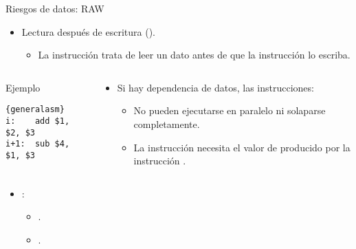 \begin{frame}[t,fragile]{Riesgos de datos: RAW}
\begin{itemize}
  \item Lectura después de escritura ().
    \begin{itemize}
      \item La instrucción  trata de leer un dato antes de que la
            instrucción  lo escriba.
    \end{itemize}
\end{itemize}
\begin{columns}
\begin{column}{.25\textwidth}
\begin{block}{Ejemplo}
\begin{lstlisting}{generalasm}
i:    add $1, $2, $3
i+1:  sub $4, $1, $3
\end{lstlisting}
\end{block}
\end{column}
\begin{column}{.75\textwidth}
\begin{itemize}
  \item Si hay dependencia de datos, las instrucciones:
    \begin{itemize}
      \item No pueden ejecutarse en paralelo ni solaparse completamente.
      \item La instrucción  necesita el valor de 
            producido por la instrucción .
    \end{itemize}
\end{itemize}
\end{column}
\end{columns}
\begin{itemize}
  \item {}:
  \begin{itemize}
    \item {}.
    \item {}.
  \end{itemize}
\end{itemize}
\end{frame}

